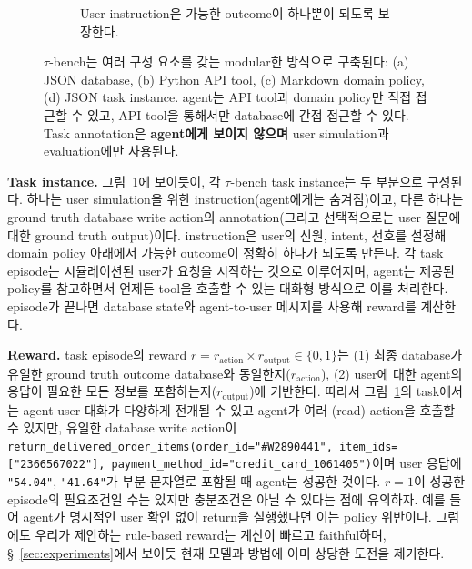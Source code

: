 \documentclass{article}
\newcommand{\benchmark}{$\tau$-bench}
\begin{document}
\begin{figure}[t]
\begin{subfigure}[t]{0.56\textwidth}
\caption{User instruction은 가능한 outcome이 하나뿐이 되도록 보장한다.}
\label{fig:task}
\end{subfigure}
\caption{\benchmark{}는 여러 구성 요소를 갖는 modular한 방식으로 구축된다: (a) JSON database, (b) Python API tool, (c) Markdown domain policy, (d) JSON task instance. agent는 API tool과 domain policy만 직접 접근할 수 있고, API tool을 통해서만 database에 간접 접근할 수 있다. Task annotation은 \textbf{agent에게 보이지 않으며} user simulation과 evaluation에만 사용된다.}
\label{fig:examples}
\vspace{-10pt}
\end{figure}



\textbf{Task instance.} 그림~\ref{fig:task}에 보이듯이, 각 \benchmark{} task instance는 두 부분으로 구성된다. 하나는 user simulation을 위한 instruction(agent에게는 숨겨짐)이고, 다른 하나는 ground truth database write action의 annotation(그리고 선택적으로는 user 질문에 대한 ground truth output)이다. instruction은 user의 신원, intent, 선호를 설정해 domain policy 아래에서 가능한 outcome이 정확히 하나가 되도록 만든다. 각 task episode는 시뮬레이션된 user가 요청을 시작하는 것으로 이루어지며, agent는 제공된 policy를 참고하면서 언제든 tool을 호출할 수 있는 대화형 방식으로 이를 처리한다. episode가 끝나면 database state와 agent-to-user 메시지를 사용해 reward를 계산한다.


\textbf{Reward.} task episode의 reward $r = r_\text{action} \times r_\text{output} \in \{0, 1\}$는 (1) 최종 database가 유일한 ground truth outcome database와 동일한지($r_\text{action}$), (2) user에 대한 agent의 응답이 필요한 모든 정보를 포함하는지($r_\text{output}$)에 기반한다. 따라서 그림~\ref{fig:task}의 task에서는 agent-user 대화가 다양하게 전개될 수 있고 agent가 여러 (read) action을 호출할 수 있지만, 유일한 database write action이 \texttt{return\_delivered\_order\_items(order\_id="\#W2890441", item\_ids=["2366567022"], payment\_method\_id="credit\_card\_1061405")}이며 user 응답에 \texttt{"54.04"}, \texttt{"41.64"}가 부분 문자열로 포함될 때 agent는 성공한 것이다. $r=1$이 성공한 episode의 필요조건일 수는 있지만 충분조건은 아닐 수 있다는 점에 유의하자. 예를 들어 agent가 명시적인 user 확인 없이 return을 실행했다면 이는 policy 위반이다. 그럼에도 우리가 제안하는 rule-based reward는 계산이 빠르고 faithful하며, \S~\ref{sec:experiments}에서 보이듯 현재 모델과 방법에 이미 상당한 도전을 제기한다.
\end{document}

